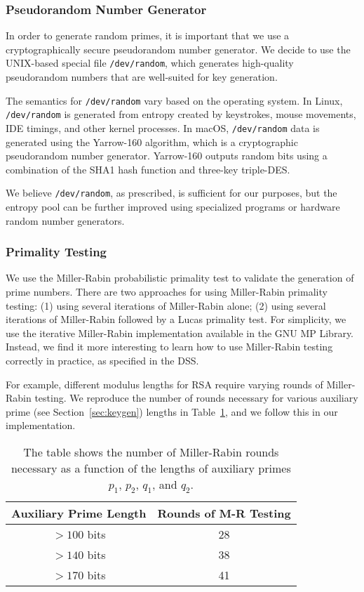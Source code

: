 \documentclass[a4paper]{article}
\begin{document}
\subsubsection{Pseudorandom Number Generator}\label{sec:prng}
In order to generate random primes, it is important that we use a cryptographically secure pseudorandom number generator. We decide to use the UNIX-based special file {\tt /dev/random}, which generates high-quality pseudorandom numbers that are well-suited for key generation.

The semantics for {\tt /dev/random} vary based on the operating system. In Linux,  {\tt /dev/random} is generated from entropy created by keystrokes, mouse movements, IDE timings, and other kernel processes. In macOS, {\tt /dev/random} data is generated using the Yarrow-160 algorithm, which is a cryptographic pseudorandom number generator. Yarrow-160 outputs random bits using a combination of the SHA1 hash function and three-key triple-DES.

We believe {\tt /dev/random}, as prescribed, is sufficient for our purposes, but the entropy pool can be further improved using specialized programs or hardware random number generators.

\subsubsection{Primality Testing}

We use the Miller-Rabin probabilistic primality test to validate the generation of prime numbers. There are two approaches for using Miller-Rabin primality testing: (1) using several iterations of Miller-Rabin alone; (2) using several iterations of Miller-Rabin followed by a Lucas primality test. For simplicity, we use the iterative Miller-Rabin implementation available in the GNU MP Library. Instead, we find it more interesting to learn how to use Miller-Rabin testing correctly
in practice, as specified in the DSS.

For example, different modulus lengths for RSA require varying rounds of Miller-Rabin testing. We reproduce the number of rounds necessary for various auxiliary prime (see Section~\ref{sec:keygen}) lengths in Table~\ref{tab:mr}, and we follow this in our implementation.

\begin{table}[h]
\centering
\begin{tabular}{|c|c|} 
 \hline
 Auxiliary Prime Length & Rounds of M-R Testing  \\ \hline
 $>100$ bits & 28 \\ 
 $>140$ bits & 38 \\ 
 $>170$ bits & 41 \\
 \hline
\end{tabular}
\caption{The table shows the number of Miller-Rabin rounds necessary as a function of the lengths of auxiliary primes $p_1$, $p_2$, $q_1$, and $q_2$.}
\label{tab:mr}
\end{table}
\end{document}
